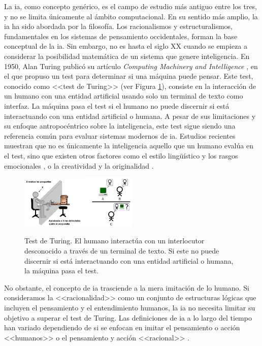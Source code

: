 La \gls{ia}, como concepto genérico, es el campo de estudio más antiguo entre los tres, y no se limita únicamente al ámbito computacional. En su sentido más amplio, la \gls{ia} ha sido abordada por la filosofía. Los racionalismos y estructuralismos, fundamentales en los sistemas de pensamiento occidentales, forman la base conceptual de la \gls{ia}. Sin embargo, no es hasta el siglo XX cuando se empieza a considerar la posibilidad matemática de un sistema que genere inteligencia. En 1950, Alan Turing publicó su artículo \textit{Computing Machinery and Intelligence} \citep{alan1950a}, en el que propuso un test para determinar si una máquina puede pensar. Este test, conocido como <<test de Turing>> (ver Figura \ref{fig:test_turing}), consiste en la interacción de un humano con una entidad artificial usando solo un terminal de texto como interfaz. La máquina pasa el test si el humano no puede discernir si está interactuando con una entidad artificial o humana. A pesar de sus limitaciones y su enfoque antropocéntrico sobre la inteligencia, este test sigue siendo una referencia común para evaluar sistemas modernos de \gls{ia}. Estudios recientes muestran que no es únicamente la inteligencia aquello que un humano evalúa en el test, sino que existen otros factores como el estilo lingüístico y los rasgos emocionales \citep{jonesDoesGPT4Pass2023}, o la creatividad y la originalidad \citep{noeverTuringDeception2022}.

\begin{figure}[H]
    \caption[Test de Turing]{Test de Turing. El humano interactúa con un interlocutor desconocido a través de un terminal de texto. Si este no puede discernir si está interactuando con una entidad artificial o humana, la máquina pasa el test.}
    \centering
    \includegraphics[width=0.5\textwidth]{./figuras/test_turing.png}
    \label{fig:test_turing}
\end{figure}

No obstante, el concepto de \gls{ia} trasciende a la mera imitación de lo humano. Si consideramos la <<racionalidad>> como un conjunto de estructuras lógicas que incluyen el pensamiento y el entendimiento humanos, la \gls{ia} no necesita limitar su objetivo a superar el test de Turing. Las definiciones de \gls{ia} a lo largo del tiempo han variado dependiendo de si se enfocan en imitar el pensamiento o acción <<humanos>> o el pensamiento y acción <<racional>> \citep{RussellStuartJ2021AI:A}.

